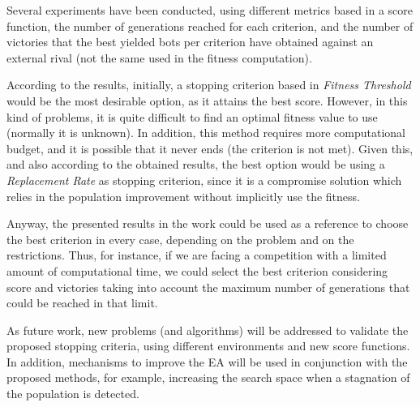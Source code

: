 \documentclass[runningheads,a4paper]{llncs}
\begin{document}
Several experiments have been conducted, using different metrics based in a score function, the number of generations reached for each criterion, and the number of victories that the best yielded bots per criterion have obtained against an external rival (not the same used in the fitness computation).

According to the results, initially, a stopping criterion based in \textit{Fitness Threshold} would be the most desirable option, as it attains the best score. However, in this kind of problems, it is quite difficult to find an optimal fitness value to use (normally it is unknown). In addition, this method requires more computational budget, and it is possible that it never ends (the criterion is not met). Given this, and also according to the obtained results, the best option would be using a \textit{Replacement Rate} as stopping criterion, since it is a compromise solution which relies in the population improvement without implicitly use the fitness.

Anyway, the presented results in the work could be used as a reference to choose the best criterion in every case, depending on the problem and on the restrictions. Thus, for instance, if we are facing a competition with a limited amount of computational time, we could select the best criterion considering score and victories taking into account the maximum number of generations that could be reached in that limit.

As future work, new problems (and algorithms) will be addressed to validate the proposed stopping criteria, using different environments and new score functions. In addition,  mechanisms to improve the EA will be used in conjunction with the proposed methods, for example, increasing the search space when a stagnation of the population is detected.


%





\end{document}
